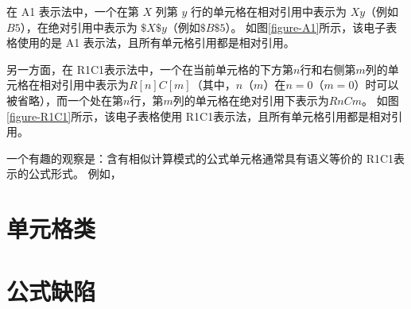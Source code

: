在 A1 表示法中，一个在第 $X$ 列第 $y$ 行的单元格在相对引用中表示为 $Xy$（例如$B5$），在绝对引用中表示为 $\$X\$y$（例如$\$B\$5$）。
如图\ref{figure-A1}所示，该电子表格使用的是 A1 表示法，且所有单元格引用都是相对引用。

另一方面，在 R1C1表示法中，一个在当前单元格的下方第$n$行和右侧第$m$列的单元格在相对引用中表示为$R[n]C[m]$（其中，$n$（$m$）在$n=0$（$m=0$）时可以被省略），而一个处在第$n$行，第$m$列的单元格在绝对引用下表示为$RnCm$。
如图\ref{figure-R1C1}所示，该电子表格使用 R1C1表示法，且所有单元格引用都是相对引用。

一个有趣的观察是：含有相似计算模式的公式单元格通常具有语义等价的 R1C1表示的公式形式。
例如，


\section{单元格类}


\section{公式缺陷}
